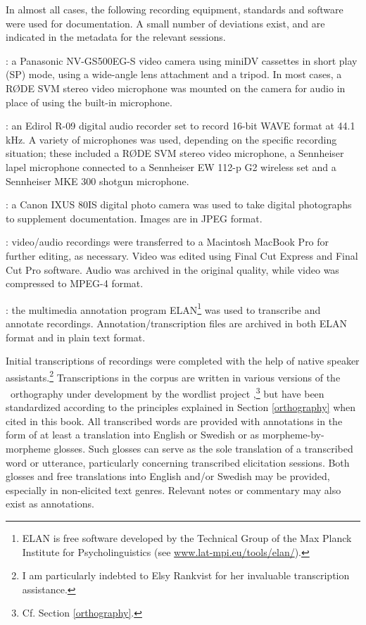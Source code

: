 In almost all cases, the following recording equipment, standards and software were used for documentation. A small number of deviations exist, and are indicated in the metadata for the relevant sessions. 
 
: a Panasonic NV-GS500EG-S video camera using miniDV cassettes in short play (SP) mode, using a wide-angle lens attachment and a tripod. In most cases, a RØDE SVM stereo video microphone was mounted on the camera for audio in place of using the built-in microphone.

: an Edirol R-09 digital audio recorder set to record 16-bit WAVE format at 44.1 kHz. A variety of microphones was used, depending on the specific recording situation; these included a RØDE SVM stereo video microphone, a Sennheiser lapel microphone connected to a Sennheiser EW 112-p G2 wireless set and a Sennheiser MKE 300 shotgun microphone. %

: a Canon IXUS 80IS digital photo camera was used to take digital photographs to supplement documentation. Images are in JPEG format.

: video/audio recordings were transferred to a Macintosh MacBook Pro for further editing, as necessary. Video was edited using Final Cut Express and Final Cut Pro software. Audio was archived in the original quality, while video was compressed to MPEG-4 format.

: the multimedia annotation program ELAN\footnote{ELAN is free software developed by the Technical Group of the Max Planck Institute for Psycholinguistics (see \href{http://www.lat-mpi.eu/tools/elan/}{www.lat-mpi.eu/tools/elan/}).} 
was used to transcribe and annotate recordings. Annotation/transcription files are archived in both ELAN format and in plain text format.


Initial transcriptions of recordings were completed with the help of native speaker assistants.\footnote{I am particularly indebted to Elsy Rankvist for her invaluable transcription assistance.} 
Transcriptions in the corpus are written in various versions of the \PS\ orthography under development by the wordlist project ,\footnote{Cf. Section \ref{orthography}.}  %
but have been standardized according to the principles explained in Section \ref{orthography} when cited in this book. 
All transcribed words are provided with annotations in the form of at least a translation into English or Swedish or as morpheme-by-morpheme glosses. Such glosses can serve as the sole translation of a transcribed word or utterance, particularly concerning transcribed elicitation sessions. Both glosses and free translations into English and/or Swedish may be provided, especially in non-elicited text genres. Relevant notes or commentary may also exist as annotations. 

